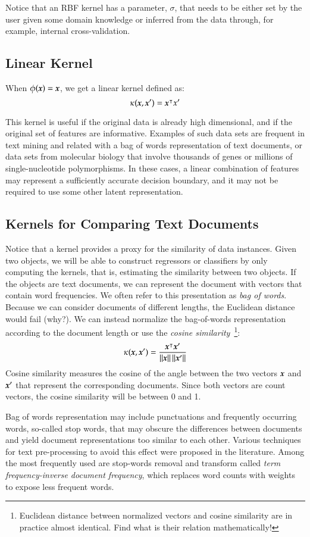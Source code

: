 \begin{refsection}
Notice that an RBF kernel has a parameter, $\sigma$, that needs to be either set by the user given some domain knowledge or inferred from the data through, for example, internal cross-validation.

\subsection*{Linear Kernel}

When $\phi(\boldsymbol{x})=\boldsymbol{x}$, we get a linear kernel defined as:
$$ \kappa(\boldsymbol{x},\boldsymbol{x}')=\boldsymbol{x}^\intercal x' $$

This kernel is useful if the original data is already high dimensional, and if the original set of features are informative. Examples of such data sets are frequent in text mining and related with a bag of words representation of text documents, or data sets from molecular biology that involve thousands of genes or millions of single-nucleotide polymorphisms. In these cases, a linear combination of features may represent a sufficiently accurate decision boundary, and it may not be required to use some other latent representation.

\subsection*{Kernels for Comparing Text Documents}

Notice that a kernel provides a proxy for the similarity of data instances. Given two objects, we will be able to construct regressors or classifiers by only computing the kernels, that is, estimating the similarity between two objects. If the objects are text documents, we can represent the document with vectors that contain word frequencies. We often refer to this presentation as {\em bag of words}. Because we can consider documents of different lengths, the Euclidean distance would fail (why?). We can instead normalize the bag-of-words representation according to the document length or use the {\em cosine similarity}~\footnote{Euclidean distance between normalized vectors and cosine similarity are in practice almost identical. Find what is their relation mathematically!}:
$$ \kappa(\boldsymbol{x}, \boldsymbol{x}')= {\boldsymbol{x}^\intercal \boldsymbol{x}'\over\left\lVert\boldsymbol{x}\right\rVert\left\lVert\boldsymbol{x}'\right\rVert}  $$
Cosine similarity measures the cosine of the angle between the two vectors $\boldsymbol{x}$ and $\boldsymbol{x}'$ that represent the corresponding documents. Since both vectors are count vectors, the cosine similarity will be between 0 and 1. 

Bag of words representation may include punctuations and frequently occurring words, so-called stop words, that may obscure the differences between documents and yield document representations too similar to each other. Various techniques for text pre-processing to avoid this effect were proposed in the literature. Among the most frequently used are stop-words removal and transform called {\em term frequency-inverse document frequency}, which replaces word counts with weights to expose less frequent words.


\end{refsection}
